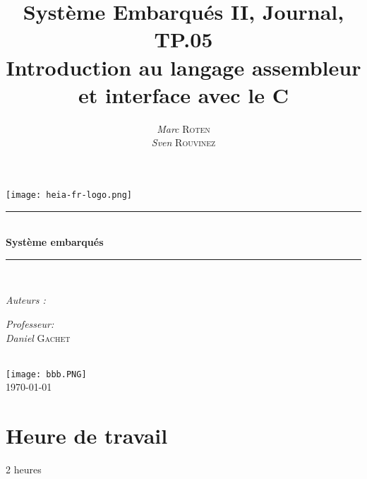 

\title{Système Embarqués II, Journal, TP.05\\  Introduction au langage assembleur et interface avec le C}
\author{\textsl{Marc} \textsc{Roten} \\ \textsl{Sven} \textsc{Rouvinez}}
\date{}
 

    \begin{titlepage}
        \begin{center}
            \texttt{[image: heia-fr-logo.png]}\\[1.3cm]
            
            \rule{\linewidth}{0.3mm} \\[0.3cm]
            {\huge \bfseries Système embarqués \\[0.5cm]} 
            \rule{\linewidth}{0.3mm} \\[0.8cm]
            \noindent
            \begin{minipage}[t]{0.4\textwidth}
                \begin{flushleft} \large
                    \emph{Auteurs :}\\
                    \theauthor 
                \end{flushleft}
            \end{minipage}
            \begin{minipage}[t]{0.4\textwidth} 
                \begin{flushright} \large
                    \emph{Professeur:}\\
                    \textsl{Daniel} \textsc{Gachet}\\ 
                \end{flushright} 
                \vfill
            \end{minipage}\\[1.3cm]
            \texttt{[image: bbb.PNG]}\\[1.5cm]
            \vspace*{1\baselineskip}
            \today \\[0.7cm]
        \end{center}
    \end{titlepage}
    \tableofcontents
    \clearpage
\section{Heure de travail}
2 heures

